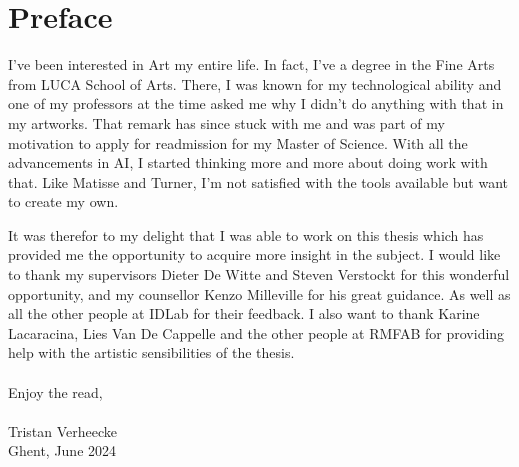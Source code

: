 \chapter*{Preface}

I've been interested in Art my entire life. In fact, I've a degree in the Fine Arts from LUCA School of Arts.
There, I was known for my technological ability and one of my professors at the time asked me why I didn't do anything with that in my artworks.
That remark has since stuck with me and was part of my motivation to apply for readmission for my Master of Science.
With all the advancements in AI, I started thinking more and more about doing work with that.
Like Matisse and Turner, I'm not satisfied with the tools available but want to create my own.

It was therefor to my delight that I was able to work on this thesis which has provided me the opportunity to acquire more insight in the subject.
I would like to thank my supervisors Dieter De Witte and Steven Verstockt for this wonderful opportunity,
and my counsellor Kenzo Milleville for his great guidance. As well as all the other people at IDLab for their feedback.
I also want to thank Karine Lacaracina, Lies Van De Cappelle and the other people at RMFAB for providing help with the artistic sensibilities of the thesis.
\\
\\
Enjoy the read,
\\
\\
Tristan Verheecke\\
Ghent, June 2024